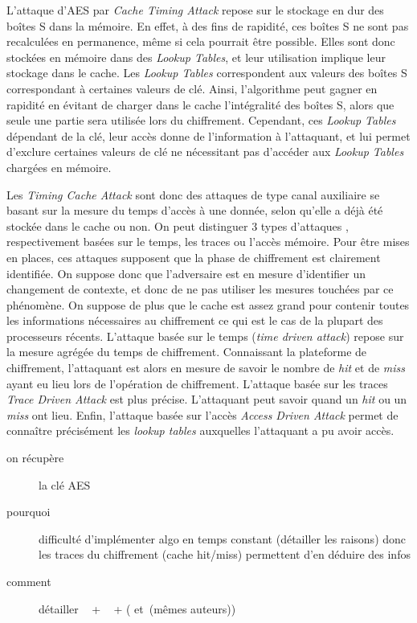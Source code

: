 \documentclass[a4paper,11pt]{article}
\begin{document}
L'attaque d'AES par \emph{Cache Timing Attack} repose sur le stockage en dur des boîtes S dans la mémoire. %
En effet, à des fins de rapidité, ces boîtes S ne sont pas recalculées en permanence, même si cela pourrait être possible. Elles sont donc stockées en mémoire dans des \emph{Lookup Tables}, et leur utilisation implique leur stockage dans le cache. Les \emph{Lookup Tables} correspondent aux valeurs des boîtes S correspondant à certaines valeurs de clé. Ainsi, l'algorithme peut gagner en rapidité en évitant de charger dans le cache l'intégralité des boîtes S, alors que seule une partie sera utilisée lors du chiffrement. Cependant, ces \emph{Lookup Tables} dépendant de la clé, leur accès donne de l'information à l'attaquant, et lui permet d'exclure certaines valeurs de clé ne nécessitant pas d'accéder aux \emph{Lookup Tables} chargées en mémoire.


Les \emph{Timing Cache Attack} sont donc des attaques de type canal auxiliaire se basant sur la mesure du temps d'accès à une donnée, selon qu'elle a déjà été stockée dans le cache ou non. On peut distinguer 3 types d'attaques \cite{aciiccmez2006trace}, respectivement basées sur le temps, les traces ou l'accès mémoire.
Pour être mises en places, ces attaques supposent que la phase de chiffrement est clairement identifiée. On suppose donc que l'adversaire est en mesure d'identifier un changement de contexte, et donc de ne pas utiliser les mesures touchées par ce phénomène. On suppose de plus que le cache est assez grand pour contenir toutes les informations nécessaires au chiffrement ce qui est le cas de la plupart des processeurs récents.
L'attaque basée sur le temps (\emph{time driven attack}) repose sur la mesure agrégée du temps de chiffrement. Connaissant la plateforme de chiffrement, l'attaquant est alors en mesure de savoir le nombre de \emph{hit} et de \emph{miss} ayant eu lieu lors de l'opération de chiffrement.
L'attaque basée sur les traces \emph{Trace Driven Attack} est plus précise. L'attaquant peut savoir quand un \emph{hit} ou un \emph{miss} ont lieu. %
Enfin, l'attaque basée sur l'accès \emph{Access Driven Attack} permet de connaître précisément les \emph{lookup tables} auxquelles l'attaquant a pu avoir accès. %
 
\begin{description}
\item[on récupère] la clé AES
\item[pourquoi] difficulté d'implémenter algo en temps constant (détailler les raisons) donc les traces du chiffrement (cache hit/miss) permettent d'en déduire des infos
\item[comment] détailler  ~\cite{canteaut2006understanding} + ~\cite{bernstein2005cache} + (\cite{tromer2010efficient} et~\cite{osvik2006cache}(mêmes auteurs))
\end{description}
\end{document}
